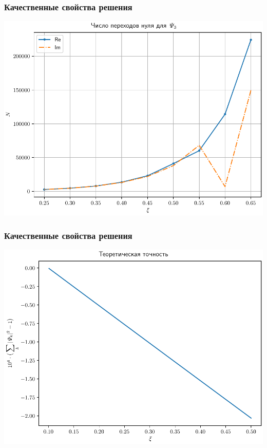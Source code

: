 \documentclass[utf8,9pt,mathserif,usepdftitle=false]{beamer}
\begin{document}
\begin{frame}
	\frametitle{Качественные свойства решения}%
	\includegraphics[width=\linewidth]{psi3-trans-ru}
\end{frame}

\begin{frame}
	\frametitle{Качественные свойства решения}%
	\includegraphics[width=\linewidth]{control-scaled}
\end{frame}
\end{document}
